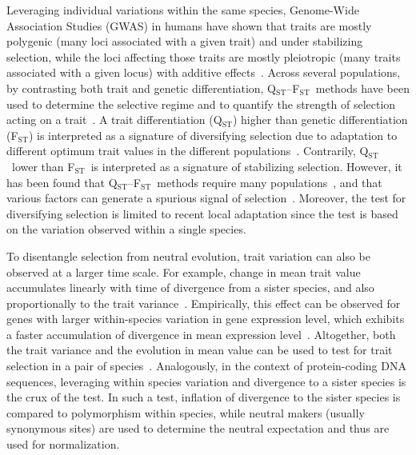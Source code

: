 \documentclass{article}
\newcommand{\Qst}{Q$_\text{ST}$}
\newcommand{\Fst}{F$_\text{ST}$}
\newcommand{\QstFst}{\Qst--\Fst}
\begin{document}
Leveraging individual variations within the same species, Genome-Wide Association Studies (GWAS) in humans have shown that traits are mostly polygenic (many loci associated with a given trait) and under stabilizing selection, while the loci affecting those traits are mostly pleiotropic (many traits associated with a given locus) with additive effects~\parencite{simons_population_2018, sella_thinking_2019}.
Across several populations, by contrasting both trait and genetic differentiation, \QstFst\ methods have been used to determine the selective regime and to quantify the strength of selection acting on a trait~\parencite{merila_comparison_2001, leinonen_comparative_2008}.
A trait differentiation (\Qst) higher than genetic differentiation (\Fst) is interpreted as a signature of diversifying selection due to adaptation to different optimum trait values in the different populations~\parencite{lamy_qst_2012}.
Contrarily, \Qst\ lower than \Fst\ is interpreted as a signature of stabilizing selection.
However, it has been found that \QstFst\ methods require many populations~\parencite{ohara_bias_2005}, and that various factors can generate a spurious signal of selection~\parencite{pujol_are_2008, edelaar_comparisons_2011}.
Moreover, the test for diversifying selection is limited to recent local adaptation since the test is based on the variation observed within a single species.

To disentangle selection from neutral evolution, trait variation can also be observed at a larger time scale.
For example, change in mean trait value accumulates linearly with time of divergence from a sister species, and also proportionally to the trait variance~\parencite{lande_genetic_1980, turelli_heritable_1984}. %
Empirically, this effect can be observed for genes with larger within-species variation in gene expression level, which exhibits a faster accumulation of divergence in mean expression level~\parencite{khaitovich_neutral_2004}.
Altogether, both the trait variance and the evolution in mean value can be used to test for trait selection in a pair of species~\parencite{walsh_evolution_2018}.
Analogously, in the context of protein-coding DNA sequences, leveraging within species variation and divergence to a sister species is the crux of the \textcite{mcdonald_adaptative_1991} test. In such a test, inflation of divergence to the sister species is compared to polymorphism within species, while neutral makers (usually synonymous sites) are used to determine the neutral expectation and thus are used for normalization.
\end{document}
